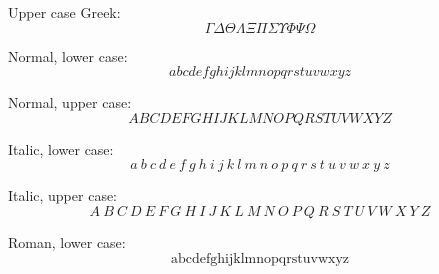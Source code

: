 \documentclass[12pt,a4paper]{article}
\begin{document}
Upper case Greek:
\begin{equation}
\Gamma  \Delta  \Theta  \Lambda  \Xi  \Pi  \Sigma  \Upsilon  \Phi  \Psi  \Omega
\end{equation}

Normal, lower case:
\begin{equation}
a  b  c  d  e  f  g  h  i  j  k  l  m  n  o  p  q  r  s  t  u  v  w  x  y  z
\end{equation}

Normal, upper case:
\begin{equation}
A  B  C  D  E  F  G  H  I  J  K  L  M  N  O  P  Q  R  S  T  U  V  W  X  Y  Z  
\end{equation}

%


Italic, lower case:
\begin{equation}
\mathit{a}~\mathit{b}~\mathit{c}~\mathit{d}~\mathit{e}~\mathit{f}~\mathit{g}~\mathit{h}~\mathit{i}~\mathit{j}~\mathit{k}~\mathit{l}~\mathit{m}~\mathit{n}~\mathit{o}~\mathit{p}~\mathit{q}~\mathit{r}~\mathit{s}~\mathit{t}~\mathit{u}~\mathit{v}~\mathit{w}~\mathit{x}~\mathit{y}~\mathit{z}
\end{equation}

Italic, upper case:
\begin{equation}
\mathit{A}~\mathit{B}~\mathit{C}~\mathit{D}~\mathit{E}~\mathit{F}~\mathit{G}~\mathit{H}~\mathit{I}~\mathit{J}~\mathit{K}~\mathit{L}~\mathit{M}~\mathit{N}~\mathit{O}~\mathit{P}~\mathit{Q}~\mathit{R}~\mathit{S}~\mathit{T}~\mathit{U}~\mathit{V}~\mathit{W}~\mathit{X}~\mathit{Y}~\mathit{Z}
\end{equation}

Roman, lower case:
\begin{equation}
\mathrm{a}  \mathrm{b}  \mathrm{c}  \mathrm{d}  \mathrm{e}  \mathrm{f}  \mathrm{g}  \mathrm{h}  \mathrm{i}  \mathrm{j}  \mathrm{k}  \mathrm{l}  \mathrm{m}  \mathrm{n}  \mathrm{o}  \mathrm{p}  \mathrm{q}  \mathrm{r}  \mathrm{s}  \mathrm{t}  \mathrm{u}  \mathrm{v}  \mathrm{w}  \mathrm{x}  \mathrm{y}  \mathrm{z}
\end{equation}
\end{document}
